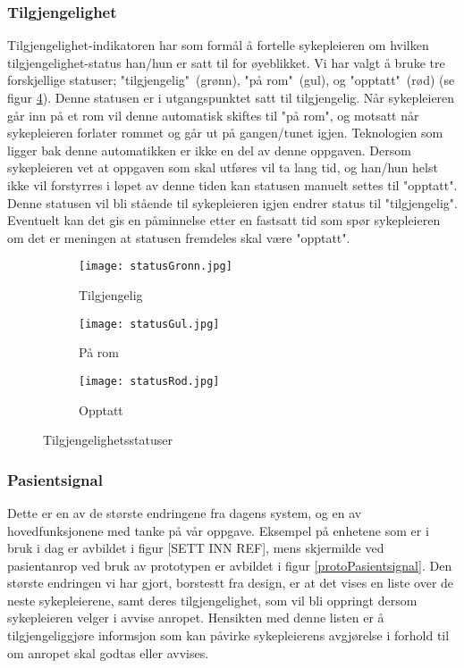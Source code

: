 \subsubsection{Tilgjengelighet}
Tilgjengelighet-indikatoren har som formål å fortelle sykepleieren om hvilken tilgjengelighet-status han/hun er satt til for øyeblikket. Vi har valgt å bruke tre forskjellige statuser; "tilgjengelig"\ (grønn), "på rom"\ (gul), og "opptatt"\ (rød) (se figur \ref{tilgjengelighetsstatuser}). Denne statusen er i utgangspunktet satt til tilgjengelig. Når sykepleieren går inn på et rom vil denne automatisk skiftes til "på rom", og motsatt når sykepleieren forlater rommet og går ut på gangen/tunet igjen. Teknologien som ligger bak denne automatikken er ikke en del av denne oppgaven. Dersom sykepleieren vet at oppgaven som skal utføres vil ta lang tid, og han/hun helst ikke vil forstyrres i løpet av denne tiden kan statusen manuelt settes til "opptatt". Denne statusen vil bli stående til sykepleieren igjen endrer status til "tilgjengelig". Eventuelt kan det gis en påminnelse etter en fastsatt tid som spør sykepleieren om det er meningen at statusen fremdeles skal være "opptatt".

\begin{figure}
	\centering
	\begin{subfigure}[b]{0.3\textwidth}
		\texttt{[image: statusGronn.jpg]}
		\caption{Tilgjengelig}
		\label{proto_startside}
	\end{subfigure}
	\begin{subfigure}[b]{0.3\textwidth}
		\texttt{[image: statusGul.jpg]}
		\caption{På rom}
		\label{proto_startside}
	\end{subfigure}
	\begin{subfigure}[b]{0.3\textwidth}
		\texttt{[image: statusRod.jpg]}
		\caption{Opptatt}
		\label{proto_startside_medMeny}
	\end{subfigure}
	\caption{Tilgjengelighetsstatuser}
	\label{tilgjengelighetsstatuser}
\end{figure}

\subsubsection{Pasientsignal}
Dette er en av de største endringene fra dagens system, og en av hovedfunksjonene med tanke på vår oppgave. Eksempel på enhetene som er i bruk i dag er avbildet i figur [SETT INN REF], mens skjermilde ved pasientanrop ved bruk av prototypen er avbildet i figur \ref{protoPasientsignal}. Den største endringen vi har gjort, borstestt fra design, er at det vises en liste over de neste sykepleierene, samt deres tilgjengelighet, som vil bli oppringt dersom sykepleieren velger i avvise anropet. Hensikten med denne listen er å tilgjengeliggjøre informsjon som kan påvirke sykepleierens avgjørelse i forhold til om anropet skal godtas eller avvises.

